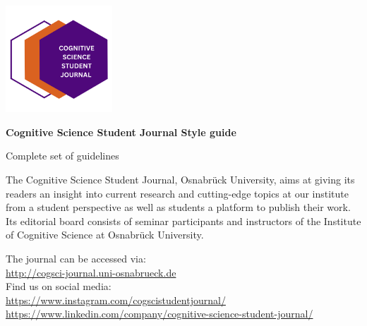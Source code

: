 
\begin{titlepage}


\begin{tcolorbox}[colback=cssj_purple!80!black,colframe=cssj_purple!80!black]
\color{white}
\includegraphics[width=0.3\textwidth]{images/CSSJ_logo.png}

\vspace{1cm}
\noindent \Huge\textbf{Cognitive Science Student Journal Style guide}

\vspace{1cm}
\noindent \huge Complete set of guidelines
\vspace{1cm}
\end{tcolorbox}
    
\vspace{2.5cm}
\noindent The Cognitive Science Student Journal, Osnabrück University, aims at giving its readers an insight into current research and cutting-edge topics at our institute from a student perspective as well as students a platform to publish their work. Its editorial board consists of seminar participants and instructors of the Institute of Cognitive Science at Osnabrück University. 

\vspace{0.6cm}
\noindent The journal can be accessed via: \\
\hyperref[http://cogsci-journal.uni-osnabrueck.de]{\url{http://cogsci-journal.uni-osnabrueck.de}}\\

\noindent Find us on social media: \\
\hyperref[https://www.instagram.com/cogscistudentjournal/]{\url{https://www.instagram.com/cogscistudentjournal/}}\\
\hyperref[https://www.linkedin.com/company/cognitive-science-student-journal/]{\url{https://www.linkedin.com/company/cognitive-science-student-journal/}}\\


\end{titlepage}